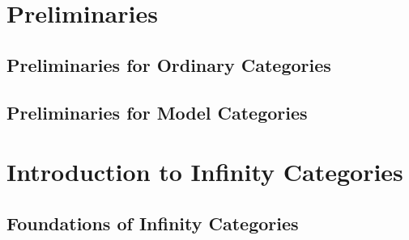 \documentclass[12pt]{report}
\begin{document}


\setcounter{section}{-1}

\section{Preliminaries}

\subsection{Preliminaries for Ordinary Categories}



\subsection{Preliminaries for Model Categories}



\section{Introduction to Infinity Categories}

\subsection{Foundations of Infinity Categories}


\end{document}
